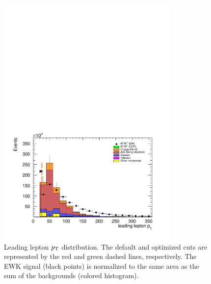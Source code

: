 \begin{figure}[htp]
  \centering
  \includegraphics[width=0.8\textwidth]{figs/ssww_upgrade/optimization_plots/lep0pt}
  \caption{Leading lepton $p_{\mathrm{T}}$ distribution.  The default and optimized cuts are represented by the red and green dashed lines, respectively.  The \ssww EWK signal (black points) is normalized to the same area as the sum of the backgrounds (colored histogram). }
  \label{fig:optimized_lep0pt}
\end{figure}

